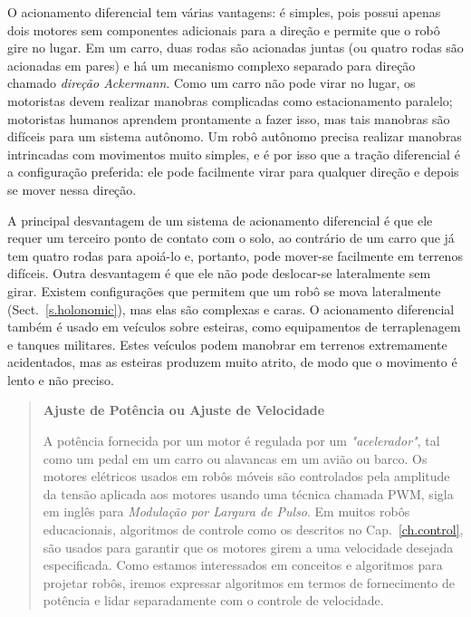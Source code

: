 O acionamento diferencial tem várias vantagens: é simples, pois possui apenas dois motores sem componentes adicionais para a direção e permite que o robô gire no lugar. Em um carro, duas rodas são acionadas juntas (ou quatro rodas são acionadas em pares) e há um mecanismo complexo separado para direção chamado \emph{direção Ackermann}. Como um carro não pode virar no lugar, os motoristas devem realizar manobras complicadas como estacionamento paralelo; motoristas humanos aprendem prontamente a fazer isso, mas tais manobras são difíceis para um sistema autônomo. Um robô autônomo precisa realizar manobras intrincadas com movimentos muito simples, e é por isso que a tração diferencial é a configuração preferida: ele pode facilmente virar para qualquer direção e depois se mover nessa direção.

A principal desvantagem de um sistema de acionamento diferencial é que ele requer um terceiro ponto de contato com o solo, ao contrário de um carro que já tem quatro rodas para apoiá-lo e, portanto, pode mover-se facilmente em terrenos difíceis. Outra desvantagem é que ele não pode deslocar-se lateralmente sem girar. Existem configurações que permitem que um robô se mova lateralmente (Sect.~\ref{s.holonomic}), mas elas são complexas e caras. O acionamento diferencial também é usado em veículos sobre esteiras, como equipamentos de terraplenagem e tanques militares. Estes veículos podem manobrar em terrenos extremamente acidentados, mas as esteiras produzem muito atrito, de modo que o movimento é lento e não preciso.

\begin{quote}
\begin{center}
\textbf{Ajuste de Potência ou Ajuste de Velocidade}
\end{center}
A potência fornecida por um motor é regulada por um \emph{"acelerador"}, tal como um pedal em um carro ou alavancas em um avião ou barco. Os motores elétricos usados em robôs móveis são controlados pela amplitude da tensão aplicada aos motores usando uma técnica chamada PWM, sigla em inglês para \emph{Modulação por Largura de Pulso}. Em muitos robôs educacionais, algoritmos de controle como os descritos no Cap.~\ref{ch.control}, são usados para garantir que os motores girem a uma velocidade {desejada especificada}. Como estamos interessados em conceitos e algoritmos para projetar robôs, iremos expressar algoritmos em termos de fornecimento de potência e lidar separadamente com o controle de velocidade.
\end{quote}


